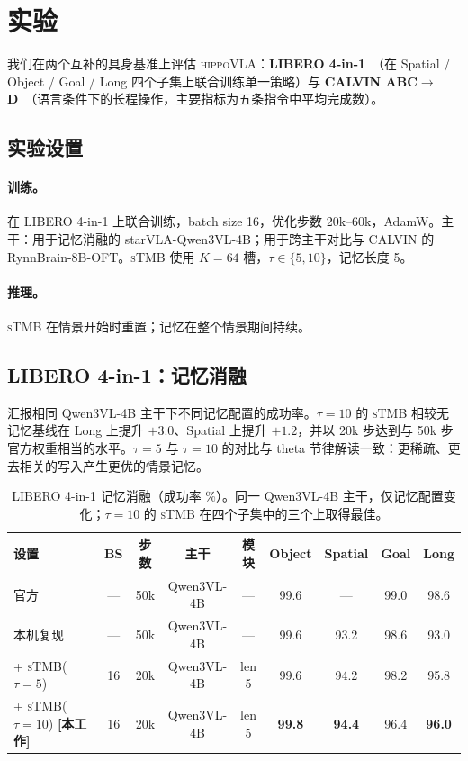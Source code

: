 \documentclass[10pt,letterpaper,fontset=fandol]{ctexart}
\newcommand{\method}{\textsc{hippoVLA}\xspace}
\newcommand{\sTMB}{\textsc{sTMB}\xspace}
\begin{document}
\section{实验}
\label{sec:exp}

我们在两个互补的具身基准上评估 \method：\textbf{LIBERO 4-in-1}~\citep{liu2023libero}（在 Spatial / Object / Goal / Long 四个子集上联合训练单一策略）与 \textbf{CALVIN ABC$\rightarrow$D}~\citep{mees2022calvin}（语言条件下的长程操作，主要指标为五条指令中平均完成数）。

\subsection{实验设置}
\paragraph{训练。} 在 LIBERO 4-in-1 上联合训练，batch size 16，优化步数 20k--60k，AdamW。主干：用于记忆消融的 starVLA-Qwen3VL-4B；用于跨主干对比与 CALVIN 的 RynnBrain-8B-OFT。\sTMB 使用 $K=64$ 槽，$\tau \in \{5,10\}$，记忆长度 5。
\paragraph{推理。} \sTMB 在情景开始时重置；记忆在整个情景期间持续。

\subsection{LIBERO 4-in-1：记忆消融}
\label{sec:exp-libero-ablation}
 汇报相同 Qwen3VL-4B 主干下不同记忆配置的成功率。$\tau=10$ 的 \sTMB 相较无记忆基线在 Long 上提升 $+3.0$、Spatial 上提升 $+1.2$，并以 20k 步达到与 50k 步官方权重相当的水平。$\tau=5$ 与 $\tau=10$ 的对比与 theta 节律解读一致：更稀疏、更去相关的写入产生更优的情景记忆。

\begin{table}[t]
\centering
\small
\caption{LIBERO 4-in-1 记忆消融（成功率 \%）。同一 Qwen3VL-4B 主干，仅记忆配置变化；$\tau=10$ 的 \sTMB 在四个子集中的三个上取得最佳。}
\label{tab:libero-mem}
\begin{tabular}{lcccccccc}
\toprule
设置 & BS & 步数 & 主干 & 模块 & Object & Spatial & Goal & Long \\
\midrule
官方                             & --- & 50k & Qwen3VL-4B & ---       & 99.6 & ---  & 99.0 & 98.6 \\
本机复现                          & --- & 50k & Qwen3VL-4B & ---       & 99.6 & 93.2 & 98.6 & 93.0 \\
+ \sTMB ($\tau{=}5$)             & 16  & 20k & Qwen3VL-4B & len 5 & 99.6 & 94.2 & 98.2 & 95.8 \\
+ \sTMB ($\tau{=}10$) \textbf{[本工作]} & 16  & 20k & Qwen3VL-4B & len 5 & \textbf{99.8} & \textbf{94.4} & 96.4 & \textbf{96.0} \\
\bottomrule
\end{tabular}
\end{table}
\end{document}
